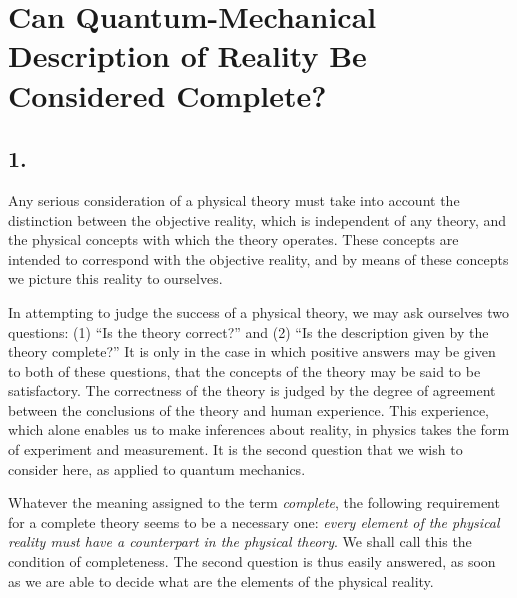 \chapter{Can Quantum-Mechanical Description of Reality Be Considered Complete?\label{EPR}}



\renewcommand{\theequation}{\arabic{equation}}

\section*{1.}

Any serious consideration of a physical theory must take into account
the distinction between the objective reality, which is independent of
any theory, and the physical concepts with which the theory operates.
These concepts are intended to correspond with the objective reality,
and by means of these concepts we picture this reality to ourselves.

In attempting to judge the success of a physical theory, we may ask
ourselves two questions: (1) ``Is the theory correct?'' and (2) ``Is the
description given by the theory complete?'' It is only in the case in
which positive answers may be given to both of these questions, that the
concepts of the theory may be said to be satisfactory. The correctness
of the theory is judged by the degree of agreement between the
conclusions of the theory and human experience. This experience, which
alone enables us to make inferences about reality, in physics takes the
form of experiment and measurement. It is the second question that we
wish to consider here, as applied to quantum mechanics.

Whatever the meaning assigned to the term \emph{complete}, the following
requirement for a complete theory seems to be a necessary one:
\emph{every element of the physical reality must have a
counterpart in the physical theory}. We shall call this the condition of
completeness. The second question is thus easily answered, as soon as we
are able to decide what are the elements of the physical reality.

